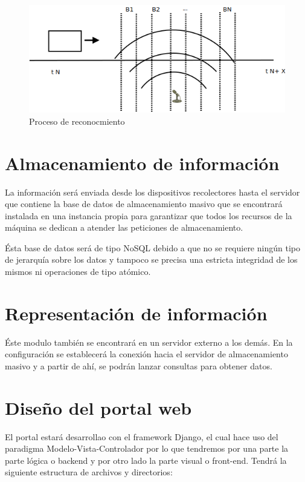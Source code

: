 \begin{figure}[!ht]
  \begin{center}
    \includegraphics[scale=0.50]{../images/sound/soun_detect.png}
    \caption{Proceso de reconocmiento}
    \label{fig:recogn}
  \end{center}
\end{figure}

\section{Almacenamiento de información}

La información será enviada desde los dispositivos recolectores hasta el servidor que contiene la base de datos de almacenamiento masivo que se encontrará instalada en una instancia propia para garantizar que todos los recursos de la máquina se dedican a atender las peticiones de almacenamiento.

Ésta base de datos será de tipo NoSQL debido a que no se requiere ningún tipo de jerarquía sobre los datos y tampoco se precisa una estricta integridad de los mismos ni operaciones de tipo atómico.

\section{Representación de información}

Éste modulo también se encontrará en un servidor externo a los demás. En la configuración se establecerá la conexión hacia el servidor de almacenamiento masivo y a partir de ahí, se podrán lanzar consultas para obtener datos.

\section{Diseño del portal web}

El portal estará desarrollao con el framework Django, el cual hace uso del paradigma Modelo-Vista-Controlador por lo que tendremos por una parte la parte lógica o backend y por otro lado la parte visual o front-end. Tendrá la siguiente estructura de archivos y directorios:

